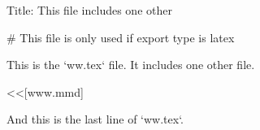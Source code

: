 Title: This file includes one other

# This file is only used if export type is latex

This is the `ww.tex` file. It includes one other file.

<<[www.mmd]

And this is the last line of `ww.tex`.
